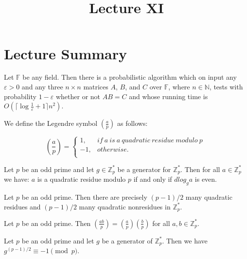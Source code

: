 \documentclass[a4paper]{article}
\title{\vspace{-2cm}Lecture XI\vspace{-2cm}}
\date{}
\begin{document}
\maketitle
\section{Lecture Summary}
\begin{theorem}
Let $\mathbb{F}$ be any field. Then there is a probabilistic algorithm which on input any $\varepsilon > 0$ and any three $n \times n$ matrices $A$, $B$, and $C$ over $\mathbb{F}$, where $n \in \mathbb{N}$, tests with probability $1 - \varepsilon$ whether or not $AB = C$ and whose running time is $O(\lceil \log{\frac{1}{\varepsilon}} + 1 \rceil n^{2})$.
\end{theorem}


\begin{definition}
We define the Legendre symbol $\left( \frac{a}{p} \right)$ as follows:
\begin{center}
\[ 
\left( \frac{a}{p} \right) = \left\{
\begin{array}{ll}
      1, & if\ a\ is\ a\ quadratic\ residue\ modulo\ p\; \\
      -1, & otherwise.\\
\end{array} 
\right. 
\]
\end{center}
\end{definition}


\begin{theorem}
Let $p$ be an odd prime and let $g \in \mathbb{Z}_{p}^{*}$ be a generator for $\mathbb{Z}_{p}^{*}$. Then for all $a \in \mathbb{Z}_{p}^{*}$ we have: $a$ is a quadratic residue modulo $p$ if and only if $dlog_{g}a$ is even.
\end{theorem}


\begin{corollary}
Let $p$ be an odd prime. Then there are precisely $(p - 1)/2$ many quadratic residues and $(p - 1)/2$ many quadratic nonresidues in $\mathbb{Z}_{p}^{*}$.
\end{corollary}


\begin{corollary}
Let $p$ be an odd prime. Then $\left( \frac{ab}{p} \right) = \left( \frac{a}{p} \right) \left( \frac{b}{p} \right)$ for all $a, b \in \mathbb{Z}_{p}^{*}$.
\end{corollary}


\begin{theorem}
Let $p$ be an odd prime and let $g$ be a generator of $\mathbb{Z}_{p}^{*}$. Then we have $g^{(p - 1) / 2} \equiv -1 \pmod{p}$.
\end{theorem}
\end{document}
